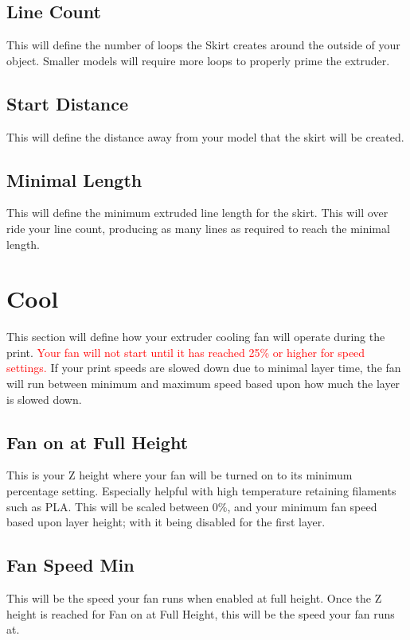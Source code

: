 \subsection{Line Count}
This will define the number of loops the Skirt creates around the outside of your object. Smaller models will require more loops to properly prime the extruder.

\subsection{Start Distance}
This will define the distance away from your model that the skirt will be created. 

\subsection{Minimal Length}
This will define the minimum extruded line length for the skirt. This will over ride your line count, producing as many lines as required to reach the minimal length.

\section{Cool}
This section will define how your extruder cooling fan will operate during the print. \textcolor{red}{Your fan will not start until it has reached 25\% or higher for speed settings.} If your print speeds are slowed down due to minimal layer time, the fan will run between minimum and maximum speed based upon how much the layer is slowed down.

\subsection{Fan on at Full Height}
This is your Z height where your fan will be turned on to its minimum percentage setting. Especially helpful with high temperature retaining filaments such as PLA. This will be scaled between 0\%, and your minimum fan speed based upon layer height; with it being disabled for the first layer.

\subsection{Fan Speed Min}

This will be the speed your fan runs when enabled at full height. Once the Z height is reached for Fan on at Full Height, this will be the speed your fan runs at.

